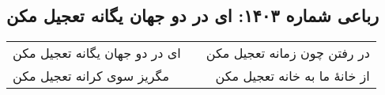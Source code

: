 \begin{center}
\section*{رباعی شماره ۱۴۰۳: ای در دو جهان یگانه تعجیل مکن}
\label{sec:1403}
\begin{longtable}{l p{0.5cm} r}
ای در دو جهان یگانه تعجیل مکن
&&
در رفتن چون زمانه تعجیل مکن
\\
مگریز سوی کرانه تعجیل مکن
&&
از خانهٔ ما به خانه تعجیل مکن
\\
\end{longtable}
\end{center}
